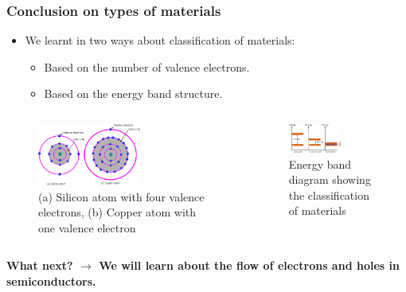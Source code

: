 \begin{frame}
	\frametitle{Conclusion on types of materials}
    \begin{itemize}
    \item We learnt in two ways about classification of materials:
        \begin{itemize}
            \item Based on the number of valence electrons.
            \item Based on the energy band structure.
        \end{itemize}
    \end{itemize}
    \begin{columns}
        \begin{column}{0.6\textwidth}
            \begin{figure}
                \centering
                \includegraphics[width=0.6\textwidth]{fig/lec02/Cu_Si_atom1.pdf}
                \caption{(a) Silicon atom with four valence electrons, (b) Copper atom with one valence electron}
            \end{figure}
        \end{column}
        \hfill
        \begin{column}{0.4\textwidth}
            \begin{figure}
                \centering
                \includegraphics[width=0.6\textwidth]{fig/lec02/band_diagram.pdf}
                \caption{Energy band diagram showing the classification of materials}
            \end{figure}
        \end{column}
\end{columns}
\textbf{What next? $\rightarrow$ We will learn about the flow of electrons and holes in semiconductors.}
\end{frame}

